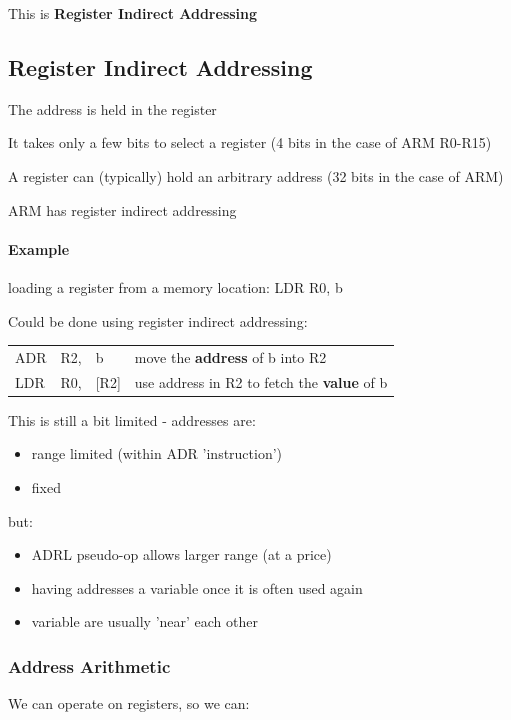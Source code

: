 \documentclass{article}
\begin{document}
This is {\bf Register Indirect Addressing}

\subsection{Register Indirect Addressing}
The address is held in the register

It takes only a few bits to select a register (4 bits in the case of ARM R0-R15)

A register can (typically) hold an arbitrary address (32 bits in the case of ARM)

ARM has register indirect addressing

\paragraph{Example}
loading a register from a memory location: LDR R0, b

Could be done using register indirect addressing:

\begin{center}
    \begin{tabular}{l l l l}
        ADR & R2, & b & move the {\bf address} of b into R2\\
        LDR & R0, & [R2] & use address in R2 to fetch the {\bf value} of b\\
    \end{tabular}
\end{center}

This is still a bit limited - addresses are:

\begin{itemize}
  \item range limited (within ADR 'instruction')
  \item fixed
\end{itemize}

but:

\begin{itemize}
  \item ADRL pseudo-op allows larger range (at a price)
  \item having addresses a variable once it is often used again
  \item variable are usually 'near' each other
\end{itemize}

\subsubsection{Address Arithmetic}
We can operate on registers, so we can:
\end{document}
